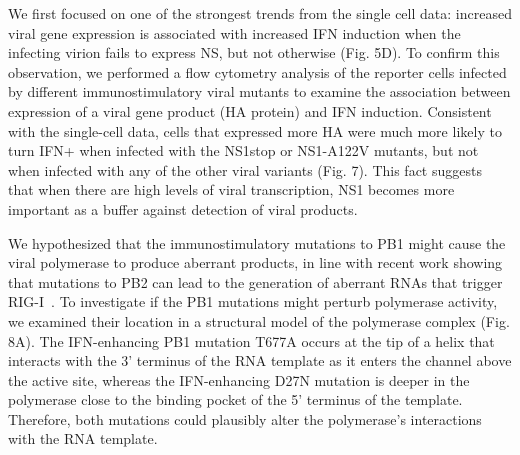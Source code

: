 \documentclass[]{article}
\begin{document}
We first focused on one of the strongest trends from the single cell data: increased viral gene expression is associated with increased IFN induction when the infecting virion fails to express NS, but not otherwise (Fig. 5D).
To confirm this observation, we performed a flow cytometry analysis of the reporter cells infected by different immunostimulatory viral mutants to examine the association between expression of a viral gene product (HA protein) and IFN induction.  
Consistent with the single-cell data, cells that expressed more HA were much more likely to turn IFN+ when infected with the NS1stop or NS1-A122V mutants, but not when infected with any of the other viral variants (Fig. 7). 
This fact suggests that when there are high levels of viral transcription, NS1 becomes more important as a buffer against detection of viral products.

We hypothesized that the immunostimulatory mutations to PB1 might cause the viral polymerase to produce aberrant products, in line with recent work showing that mutations to PB2 can lead to the generation of aberrant RNAs that trigger RIG-I~\cite{velthuis2018mini, du2018genome}.
To investigate if the PB1 mutations might perturb polymerase activity, we examined their location in a structural model of the polymerase complex (Fig. 8A).
The IFN-enhancing PB1 mutation T677A occurs at the tip of a helix that interacts with the 3' terminus of the RNA template as it enters the channel above the active site, whereas the IFN-enhancing D27N mutation is deeper in the polymerase close to the binding pocket of the 5' terminus of the template. 
Therefore, both mutations could plausibly alter the polymerase's interactions with the RNA template.
\end{document}
